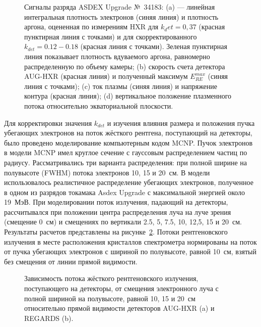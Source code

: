 \begin{figure}[ht!]
  \caption{ Сигналы разряда ASDEX Upgrade №~34183: (a) --- линейная интегральная плотность электронов (синяя линия) и плотность аргона, оцененная по измерениям HXR для $k_det = 0,37$ (красная пунктирная линия с точками) и для скорректированного $k_{det} = 0.12-0.18$ (красная линия с точками). Зеленая пунктирная линия показывает плотность вдуваемого аргона, равномерно распределенную по объему камеры; (b) скорость счета детектора AUG-HXR (красная линия) и полученный максимум $E_{RE}^{max}$ (синяя линия с точками); (c) ток плазмы (синяя линия) и напряжение контура (красная линия); (d) вертикальное положение плазменного потока относительно экваториальной плоскости.~\cite{Shevelev2021} }
  \label{fig:asdexPlasmaParamsPulse34183}
\end{figure}

Для корректировки значения $k_{det}$ и изучения влияния размера и положения пучка убегающих электронов на поток жёсткого рентгена, поступающий на детекторы, было проведено моделирование компьютерным кодом MCNP. Пучок электронов в модели MCNP имел круглое сечение с гауссовым распределением частиц по радиусу. Рассматривались три варианта распределения: при полной ширине на полувысоте (FWHM) потока электронов 10, 15 и 20~см. В модели использовалось реалистичное распределение убегающих электронов, полученное в одном из разрядов токамака Asdex Upgrade с максимальной энергией около 19~МэВ. При моделировании поток излучения, падающий на детекторы, рассчитывался при положении центра распределения луча на луче зрения (смещение 0~см) и смещениях по вертикали 2.5, 5, 7.5, 10, 12,5, 15 и 20~см. Результаты расчетов представлены на рисунке~\ref{fig:asdexModelHxrFlux}. Потоки рентгеновского излучения в месте расположения кристаллов спектрометра нормированы на поток от пучка убегающих электронов с шириной по полувысоте, равной 10~см, взятый без смещения от линии прямой видимости.~\cite{Shevelev2021}

\begin{figure}[ht!]
  \caption{ Зависимость потока жёсткого рентгеновского излучения, поступающего на детекторы, от смещения электронного луча с полной шириной на полувысоте, равной 10, 15 и 20~см относительно прямой видимости детекторов AUG-HXR (a) и REGARDS (b).~\cite{Shevelev2021} }
  \label{fig:asdexModelHxrFlux}
\end{figure}

